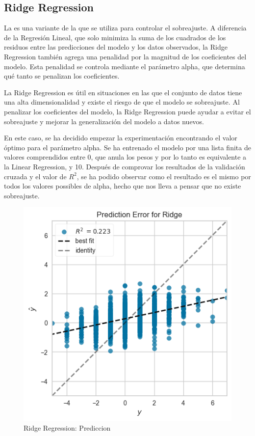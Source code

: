 \subsection{Ridge Regression}

La \cite{Sklearn Ridge} es una variante de la \cite{Sklearn Linear Regression} que se utiliza para controlar el sobreajuste. A diferencia de la Regresión Lineal, que solo minimiza la suma de los cuadrados de los residuos entre las predicciones del modelo y los datos observados, la Ridge Regression también agrega una penalidad por la magnitud de los coeficientes del modelo. Esta penalidad se controla mediante el parámetro alpha, que determina qué tanto se penalizan los coeficientes.
\newline

La Ridge Regression es útil en situaciones en las que el conjunto de datos tiene una alta dimensionalidad y existe el riesgo de que el modelo se sobreajuste. Al penalizar los coeficientes del modelo, la Ridge Regression puede ayudar a evitar el sobreajuste y mejorar la generalización del modelo a datos nuevos.
\newline

En este caso, se ha decidido empezar la experimentación encontrando el valor óptimo para el parámetro alpha. Se ha entrenado el modelo por una lista finita de valores comprendidos entre 0, que anula los pesos y por lo tanto es equivalente a la Linear Regression, y 10. Después de comprovar los resultados de la validación cruzada y el valor de $R^2$, se ha podido observar como el resultado es el mismo por todos los valores possibles de alpha, hecho que nos lleva a pensar que no existe sobreajuste. 
\newline

\begin{figure}[H]
    \centering
    \includegraphics[width=\smallSize]{images/linearModelRidge.png}
    \caption{Ridge Regression: Prediccion}
    \label{Modelos-Lineales-Ridge-Prediccion-Error}
\end{figure}

